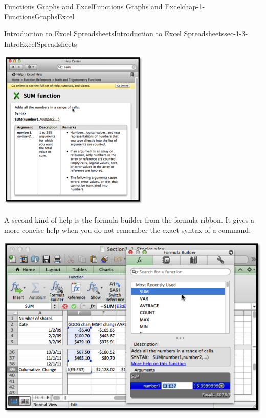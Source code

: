 \documentclass[oneside,10pt,]{book}
\numberwithin{equation}{section}
\begin{document}
\begin{chapterptx}{Functions Graphs and Excel}{}{Functions Graphs and Excel}{}{}{chap-1-FunctionsGraphsExcel}
\begin{sectionptx}{Introduction to Excel Spreadsheets}{}{Introduction to Excel Spreadsheets}{}{}{sec-1-3-IntroExcelSpreadsheets}
\begin{sidebyside}{1}{0.1}{0.1}{0}
\begin{sbspanel}{0.8}
\includegraphics[width=1\linewidth]{images/sec1-3-17.png}
\end{sbspanel}%
\end{sidebyside}%
\par
\hypertarget{p-269}{}%
A second kind of help is the formula builder from the formula ribbon.  It gives a more concise help when you do not remember the exact syntax of a command.%
\begin{sidebyside}{1}{0.1}{0.1}{0}%
\begin{sbspanel}{0.8}%
\includegraphics[width=1\linewidth]{images/sec1-3-18.png}

\end{sbspanel}
\end{sidebyside}
\end{sectionptx}
\end{chapterptx}
\end{document}
